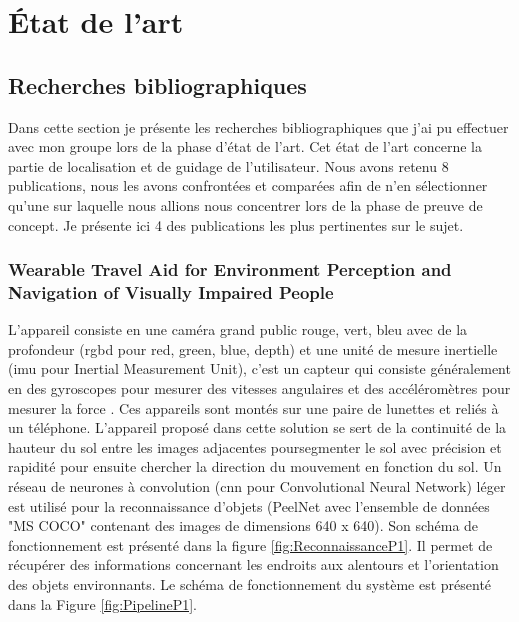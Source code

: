 \documentclass[11pt]{article}
\begin{document}
  \section{État de l'art}  

    \subsection{Recherches bibliographiques}
      Dans cette section je présente les recherches bibliographiques que j'ai pu effectuer avec mon groupe lors de la phase d'état de l'art.
      Cet état de l'art concerne la partie de localisation et de guidage de l'utilisateur. Nous avons retenu 8 publications, nous les avons 
      confrontées et comparées afin de n'en sélectionner qu'une sur laquelle nous allions nous concentrer lors de la phase de preuve de 
      concept. Je présente ici 4 des publications les plus pertinentes sur le sujet.
      
        \subsubsection{Wearable Travel Aid for Environment Perception and Navigation of Visually Impaired People}
          L'appareil consiste en une caméra grand public rouge, vert, bleu avec de la profondeur (\acrshort{rgbd} pour red, green, blue, depth)
          et une unité de mesure inertielle (\acrshort{imu} pour Inertial Measurement Unit), c'est un capteur qui consiste généralement en des gyroscopes 
          pour mesurer des vitesses angulaires et des accéléromètres pour mesurer la force \cite{baiWearableTravelAid2019}. Ces appareils sont montés sur une paire de lunettes
          et reliés à un téléphone. L'appareil proposé dans cette solution se sert de la continuité de la hauteur du sol entre les images 
          adjacentes poursegmenter le sol avec précision et rapidité pour ensuite chercher la direction du mouvement en fonction du sol.
          Un réseau de neurones à convolution (\acrshort{cnn} pour Convolutional Neural Network) léger est utilisé pour la reconnaissance d'objets 
          (PeelNet avec l'ensemble de données "MS COCO" contenant des images de dimensions 640 x 640). Son schéma de fonctionnement est présenté 
          dans la figure \ref{fig:ReconnaissanceP1}. Il permet de récupérer des informations concernant les endroits aux alentours et l'orientation 
          des objets environnants. Le schéma de fonctionnement du système est présenté dans la Figure \ref{fig:PipelineP1}.
\end{document}
